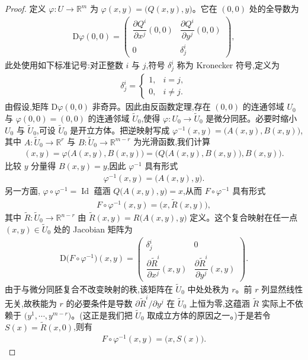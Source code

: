 \documentclass[../../main.tex]{subfiles}
\begin{document}
\begin{proof}
定义 $\varphi:U\to\mathbb{R}^m$ 为 $\varphi(x,y)=\bigl(Q(x,y),y\bigr)$。它在 $(0,0)$ 处的全导数为
\begin{align*}
\mathrm{D}\varphi(0,0)=
\begin{pmatrix}
\dfrac{\partial Q^i}{\partial x^j}(0,0) & \dfrac{\partial Q^i}{\partial y^j}(0,0)\\
0 & \delta^i_j
\end{pmatrix},
\end{align*}
此处使用如下标准记号:对正整数 $i$ 与 $j$,符号 $\delta^i_j$ 称为 Kronecker 符号,定义为
\begin{align}\label{align:ch04-kronecker}
\delta^i_j=
\begin{cases}
1,& i=j,\\
0,& i\neq j.
\end{cases}
\end{align}
由假设,矩阵 $\mathrm{D}\varphi(0,0)$ 非奇异。因此由反函数定理,存在 $(0,0)$ 的连通邻域 $U_0$ 与 $\varphi(0,0)=(0,0)$ 的连通邻域 $\widetilde{U}_0$,使得 $\varphi:U_0\to\widetilde{U}_0$ 是微分同胚。必要时缩小 $U_0$ 与 $\widetilde{U}_0$,可设 $\widetilde{U}_0$ 是开立方体。把逆映射写成 $\varphi^{-1}(x,y)=\bigl(A(x,y),B(x,y)\bigr)$,其中 $A:\widetilde{U}_0\to\mathbb{R}^r$ 与 $B:\widetilde{U}_0\to\mathbb{R}^{m-r}$ 为光滑函数,我们计算
\begin{align}\label{align:ch04-phi-inv}
(x,y)=\varphi\bigl(A(x,y),B(x,y)\bigr)=\bigl(Q\bigl(A(x,y),B(x,y)\bigr),B(x,y)\bigr).
\end{align}
比较 $y$ 分量得 $B(x,y)=y$,因此 $\varphi^{-1}$ 具有形式
\begin{align*}
\varphi^{-1}(x,y)=\bigl(A(x,y),y\bigr).
\end{align*}
另一方面, $\varphi\circ\varphi^{-1}=\operatorname{Id}$ 蕴涵 $Q\bigl(A(x,y),y\bigr)=x$,从而 $F\circ\varphi^{-1}$ 具有形式
\begin{align*}
F\circ\varphi^{-1}(x,y)=\bigl(x,\widetilde{R}(x,y)\bigr),
\end{align*}
其中 $\widetilde{R}:\widetilde{U}_0\to\mathbb{R}^{n-r}$ 由 $\widetilde{R}(x,y)=R\bigl(A(x,y),y\bigr)$ 定义。这个复合映射在任一点 $(x,y)\in\widetilde{U}_0$ 处的 Jacobian 矩阵为
\begin{align*}
\mathrm{D}\bigl(F\circ\varphi^{-1}\bigr)(x,y)=
\begin{pmatrix}
\delta^i_j & 0\\
\dfrac{\partial \widetilde{R}^i}{\partial x^j}(x,y) & \dfrac{\partial \widetilde{R}^i}{\partial y^j}(x,y)
\end{pmatrix}.
\end{align*}
由于与微分同胚复合不改变映射的秩,该矩阵在 $\widetilde{U}_0$ 中处处秩为 $r$。前 $r$ 列显然线性无关,故秩能为 $r$ 的必要条件是导数 $\partial\widetilde{R}^i/\partial y^j$ 在 $\widetilde{U}_0$ 上恒为零,这蕴涵 $\widetilde{R}$ 实际上不依赖于 $\bigl(y^1,\cdots ,y^{m-r}\bigr)$。(这正是我们把 $\widetilde{U}_0$ 取成立方体的原因之一。)于是若令 $S(x)=\widetilde{R}(x,0)$,则有
\begin{align}\label{align:ch04-after-phi}
F\circ\varphi^{-1}(x,y)=\bigl(x,S(x)\bigr).
\end{align}


\end{proof}
\end{document}
